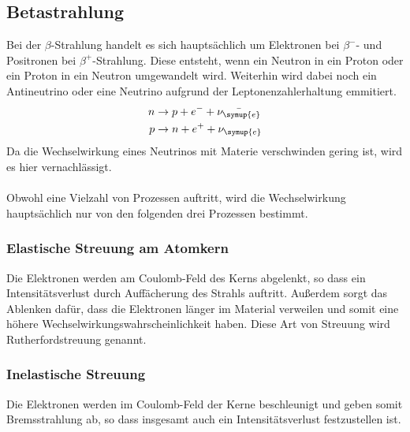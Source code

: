 \subsection{Betastrahlung}
\label{sec:Betastrahlung}
Bei der $\beta$-Strahlung handelt es sich hauptsächlich um Elektronen bei $\beta^{-}$- und Positronen bei
$\beta^{+}$-Strahlung. Diese entsteht, wenn ein Neutron in ein Proton oder ein Proton in ein Neutron umgewandelt
wird. Weiterhin wird dabei noch ein Antineutrino oder eine Neutrino aufgrund der Leptonenzahlerhaltung emmitiert.
\begin{align*}
    n &\rightarrow p + e^{-} + \bar{\nu_{\symup{e}}}\\
    p &\rightarrow n + e^{+} + \nu_{\symup{e}}
\end{align*}
Da die Wechselwirkung eines Neutrinos mit Materie verschwinden gering ist, wird es hier vernachlässigt.\\
\\
Obwohl eine Vielzahl von Prozessen auftritt, wird die Wechselwirkung hauptsächlich nur von den folgenden
drei Prozessen bestimmt.

\subsubsection{Elastische Streuung am Atomkern}
\label{sec:elastischeStreuung}
Die Elektronen werden am Coulomb-Feld des Kerns abgelenkt, so dass ein Intensitätsverlust durch Auffächerung des Strahls
auftritt. Außerdem sorgt das Ablenken dafür, dass die Elektronen länger im Material verweilen und somit eine
höhere Wechselwirkungswahrscheinlichkeit haben. Diese Art von Streuung wird Rutherfordstreuung genannt.

\subsubsection{Inelastische Streuung}
\label{sec:inelastischeStreuung}
Die Elektronen werden im Coulomb-Feld der Kerne beschleunigt und geben somit Bremsstrahlung ab, so dass insgesamt
auch ein Intensitätsverlust festzustellen ist.

